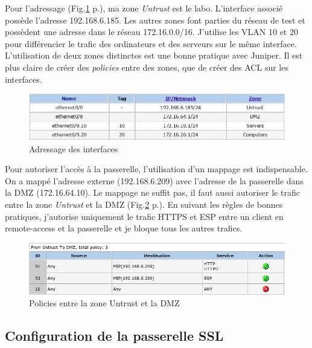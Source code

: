 Pour l'adressage (Fig.\ref{fig:ifJuniper} p.\pageref{fig:ifJuniper}), ma zone \textit{Untrust} est le labo. 
L'interface associé possède l'adresse 192.168.6.185.
Les autres zones font parties du réseau de test et possèdent une adresse dans le réseau 172.16.0.0/16.
J'utilise les VLAN 10 et 20 pour différencier le trafic des ordinateurs et des serveurs sur le même interface.
L'utilisation de deux zones distinctes est une bonne pratique avec Juniper. 
Il est plus claire de créer des \textit{policies} entre des zones, que de créer des ACL sur les interfaces.
\begin{figure}[ht]
	\centering
	\includegraphics[width=16cm]{juniper/interfaces.png}
	\caption{Adressage des interfaces}
	\label{fig:ifJuniper}
\end{figure}

Pour autoriser l'accès à la passerelle, l'utilisation d'un mappage est indispensable.
On a mappé l'adresse externe (192.168.6.209) avec l'adresse de la passerelle dans la DMZ (172.16.64.10).
Le mappage ne suffit pas, il faut aussi autoriser le trafic entre la zone \textit{Untrust} et la DMZ (Fig.\ref{fig:polUnDMZ} p.\pageref{fig:polUnDMZ}).
En suivant les règles de bonnes pratiques, j'autorise uniquement le trafic HTTPS et ESP entre un client en remote-access et la passerelle et je bloque tous les autres trafics.
\begin{figure}[ht]
	\centering
	\includegraphics[width=16cm]{juniper/Policy-Untrust-DMZ.png}
	\caption{Policies entre la zone Untrust et la DMZ}
	\label{fig:polUnDMZ}
\end{figure}

\subsection{Configuration de la passerelle  SSL}
